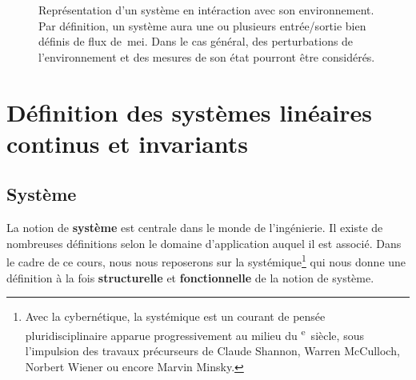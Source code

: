 \begin{figure}[!h]
\begin{center}
    
\end{center}
\caption{Représentation d'un système en intéraction avec son environnement. 
         Par définition, un système aura une ou plusieurs entrée/sortie bien 
	 définis de flux de~\gls{mei}. Dans le cas général, des perturbations 
	 de l'environnement et des mesures de son état pourront être considérés.
	 \label{fig-systeme}}
\end{figure}
\newpage
\section[Définition SLCI]
        {Définition des systèmes linéaires continus et invariants}

\subsection{Système}
La notion de \textbf{système} est centrale dans le monde de l'ingénierie.
Il existe de nombreuses définitions selon le domaine 
d'application auquel il est associé. Dans le cadre de ce cours, nous nous 
reposerons sur la systémique\footnote{Avec la cybernétique, la systémique est 
un courant de pensée pluridisciplinaire apparue progressivement au milieu du 
\textsc{}\textsuperscript{e}~siècle, sous l'impulsion des 
travaux précurseurs de Claude Shannon, 
Warren McCulloch, 
Norbert Wiener 
ou encore Marvin Minsky.} 
qui nous donne une définition à la fois \textbf{structurelle} et 
\textbf{fonctionnelle} de la notion de système.

